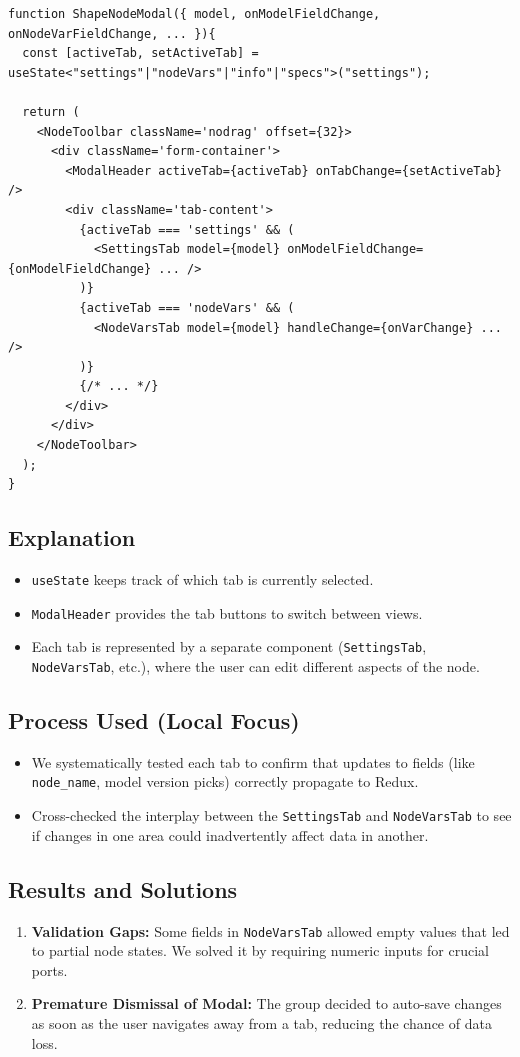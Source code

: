 \documentclass{article}
\begin{document}
\begin{verbatim}
function ShapeNodeModal({ model, onModelFieldChange, onNodeVarFieldChange, ... }){
  const [activeTab, setActiveTab] = useState<"settings"|"nodeVars"|"info"|"specs">("settings");

  return (
    <NodeToolbar className='nodrag' offset={32}>
      <div className='form-container'>
        <ModalHeader activeTab={activeTab} onTabChange={setActiveTab} />
        <div className='tab-content'>
          {activeTab === 'settings' && (
            <SettingsTab model={model} onModelFieldChange={onModelFieldChange} ... />
          )}
          {activeTab === 'nodeVars' && (
            <NodeVarsTab model={model} handleChange={onVarChange} ... />
          )}
          {/* ... */}
        </div>
      </div>
    </NodeToolbar>
  );
}
\end{verbatim}

\subsection{Explanation}
\begin{itemize}
  \item \texttt{useState} keeps track of which tab is currently selected.
  \item \texttt{ModalHeader} provides the tab buttons to switch between views.
  \item Each tab is represented by a separate component (\texttt{SettingsTab}, \texttt{NodeVarsTab}, etc.), where the user can edit different aspects of the node.
\end{itemize}

\subsection{Process Used (Local Focus)}
\begin{itemize}
  \item We systematically tested each tab to confirm that updates to fields (like \texttt{node\_name}, model version picks) correctly propagate to Redux.
  \item Cross-checked the interplay between the \texttt{SettingsTab} and \texttt{NodeVarsTab} to see if changes in one area could inadvertently affect data in another.
\end{itemize}

\subsection{Results and Solutions}
\begin{enumerate}
  \item \textbf{Validation Gaps:} Some fields in \texttt{NodeVarsTab} allowed empty values that led to partial node states. We solved it by requiring numeric inputs for crucial ports.
  \item \textbf{Premature Dismissal of Modal:} The group decided to auto-save changes as soon as the user navigates away from a tab, reducing the chance of data loss.
\end{enumerate}
\end{document}
